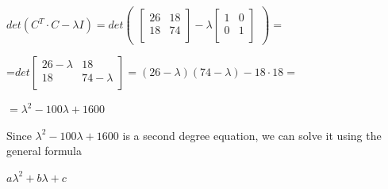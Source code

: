 \begin{center}
	$det( C^T \cdot C-\lambda I)=det\begin{pmatrix}\begin{bmatrix}
26 &   18 \\
18  &  74 \\
\end{bmatrix}-\lambda\begin{bmatrix}
1 &   0 \\
0  &  1 \\
\end{bmatrix}\end{pmatrix}=$
\end{center}\begin{center}

=$det\begin{bmatrix}
26-\lambda &   18 \\
18  &  74-\lambda \\
\end{bmatrix}=(26-\lambda)(74-\lambda)-18\cdot 18=$
\end{center}

\begin{center}
	$= \lambda^2-100\lambda+1600 $
\end{center}
Since $ \lambda^2-100\lambda+1600 $ is a second degree equation, we can solve it using the general formula \begin{center}
	$ a\lambda^2+b\lambda+c $\end{center}

